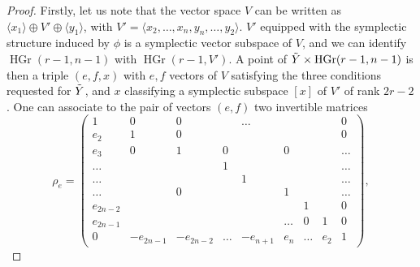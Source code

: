 \documentclass[10pt]{amsart}
\theoremstyle{definition}
\theoremstyle{plain}
\numberwithin{equation}{section}
\newcommand{\0}{\emptyset}
\newcommand{\HGr}{{\operatorname{HGr}}}
\begin{document}
\begin{proof}
    Firstly, let us note that the vector space $V$ can be written as $\langle x_1 \rangle \oplus V' \oplus \langle y_1 \rangle$, with $V' = \langle x_2, \ldots, x_n, y_n, \ldots, y_2 \rangle$. $V'$ equipped with the symplectic structure induced by $\phi$ is a symplectic vector subspace of $V$, and we can identify $\HGr(r-1,n-1)$ with $\HGr(r-1,V')$. A point of $\Tilde{Y}\times \HGr(r-1,n-1)$ is then a triple $(e,f,x)$ with $e,f$ vectors of $V$ satisfying the three conditions requested for $\Tilde{Y}$, and $x$ classifying a symplectic subspace $[x]$ of $V'$ of rank $2r-2$. One can associate to the pair of vectors $(e,f)$ two invertible matrices
$$\rho_e=
\begin{pmatrix}
    1 & 0 & 0 & & \ldots  &  & & & 0 \\
    e_2 & 1 & 0 & & & & & & 0 \\
    e_3 & 0 & 1 & 0 & & 0 & & & \ldots \\
    \ldots  & & & 1 & & & & & \ldots \\
    \ldots & & & & 1 & & & & \ldots \\
    \ldots & & 0 & & & 1 & & & \ldots \\
    e_{2n-2} & & & & & & 1 & & 0 \\
    e_{2n-1} & & & & & \ldots & 0 & 1 & 0 \\
    0 & -e_{2n-1} & -e_{2n-2} & \ldots & -e_{n+1} & e_{n} & \ldots & e_{2} & 1
\end{pmatrix},$$


\end{proof}
\end{document}
